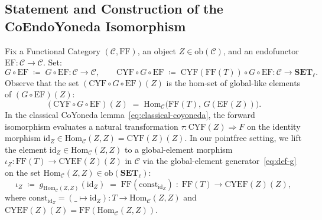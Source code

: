 \documentclass[11pt,a4paper]{article}
\theoremstyle{definition}
\theoremstyle{remark}
\newcommand{\Set}{\mathbf{SET}}
\newcommand{\Hom}{\mathrm{Hom}}
\newcommand{\id}{\mathrm{id}}
\newcommand{\CYF}{\mathrm{CYF}}
\newcommand{\CYEF}{\mathrm{CYEF}}
\newcommand{\FF}{\mathrm{FF}}
\newcommand{\EF}{\mathrm{EF}}
\newcommand{\const}{\mathrm{const}}
\newcommand{\iotaZ}{\iota_Z}
\begin{document}
\subsection{Statement and Construction of the CoEndoYoneda Isomorphism}

Fix a Functional Category $(\mathcal{C}, \FF)$, an object $Z \in \mathrm{ob}(\mathcal{C})$, and an
endofunctor $\EF : \mathcal{C} \to \mathcal{C}$. Set:
\[
  G\circ\EF \;\coloneqq\; G \circ \EF : \mathcal{C} \to \mathcal{C},
  \qquad
  \CYF\circ G\circ\EF \;\coloneqq\; \CYF(\FF(T)) \circ G \circ \EF : \mathcal{C} \to \Set_\ell.
\]
Observe that the set $(\CYF\circ G\circ\EF)(Z)$ is the hom-set of global-like elements of
$(G \circ \EF)(Z)$:
\[
  (\CYF\circ G\circ\EF)(Z) \;=\; \Hom_{\mathcal{C}}\bigl(\FF(T),\, G(\EF(Z))\bigr).
\]
In the classical CoYoneda lemma~\eqref{eq:classical-coyoneda}, the forward isomorphism evaluates a
natural transformation $\tau : \CYF(Z) \Rightarrow F$ on the identity morphism
$\id_Z \in \Hom_{\mathcal{C}}(Z, Z) = \CYF(Z)(Z)$. In our pointfree setting, we lift the element
$\id_Z \in \Hom_{\mathcal{C}}(Z, Z)$ to a global-element morphism $\iotaZ : \FF(T) \to \CYEF(Z)(Z)$ in
$\mathcal{C}$ via the global-element generator~\eqref{eq:def-g} on the set
$\Hom_{\mathcal{C}}(Z, Z) \in \mathrm{ob}(\Set_\ell)$:
\begin{equation}\label{eq:def-iotaZ}
  \iotaZ \;\coloneqq\; g_{\Hom_{\mathcal{C}}(Z, Z)}(\id_Z) \;=\; \FF(\const_{\id_Z})
  \;:\; \FF(T) \longrightarrow \CYEF(Z)(Z),
\end{equation}
where $\const_{\id_Z} = (\_ \mapsto \id_Z) : T \to \Hom_{\mathcal{C}}(Z, Z)$ and
$\CYEF(Z)(Z) = \FF(\Hom_{\mathcal{C}}(Z, Z))$.
\end{document}
